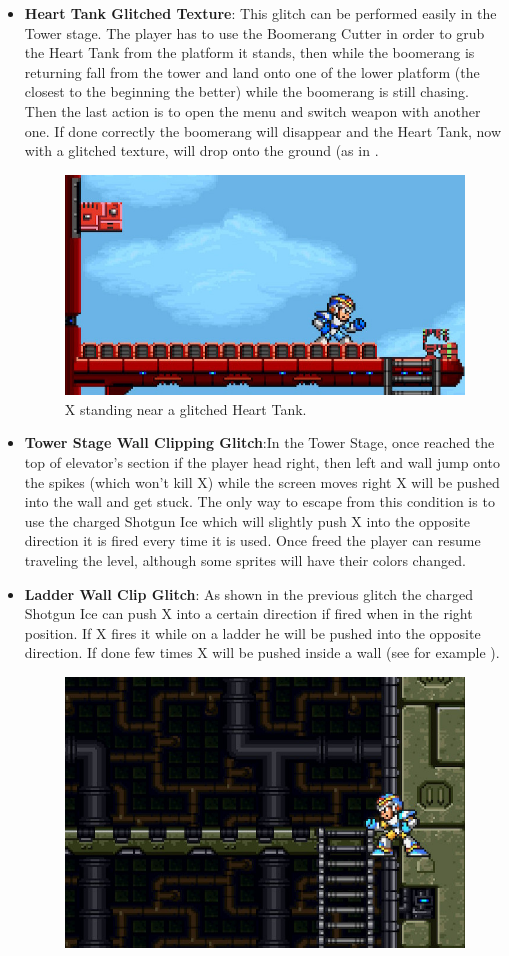\begin{itemize}
	\item \textbf{Heart Tank Glitched Texture}: This glitch can be performed easily in the Tower stage. The player has to use the Boomerang Cutter in order to grub the Heart Tank from the platform it stands, then while the boomerang is returning fall from the tower and land onto one of the lower platform (the closest to the beginning the better) while the boomerang is still chasing. Then the last action is to open the menu and switch weapon with another one. If done correctly the boomerang will disappear and the Heart Tank, now with a glitched texture, will drop onto the ground (as in .
	\begin{figure}[htp]
		\centering
		\includegraphics[width=0.5\linewidth]{figures/X1/Miscs/Tower_glitched_heart.jpg}
		\caption{X standing near a glitched Heart Tank.}
	\end{figure}
	\item \textbf{Tower Stage Wall Clipping Glitch}:In the Tower Stage, once reached the top of elevator's section if the player head right, then left and wall jump onto the spikes (which won't kill X) while the screen moves right X will be pushed into the wall and get stuck. The only way to escape from this condition is to use the charged Shotgun Ice which will slightly push X into the opposite direction it is fired every time it is used. Once freed the player can resume traveling the level, although some sprites will have their colors changed.
	\item \textbf{Ladder Wall Clip Glitch}: As shown in the previous glitch the charged Shotgun Ice can push X into a certain direction if fired when in the right position. If X fires it while on a ladder he will be pushed into the opposite direction. If done few times X will be pushed inside a wall (see for example ).
	\begin{figure}[htp]
		\centering
		\includegraphics[width=0.5\linewidth]{figures/X1/Miscs/Wall_clipping.jpg}

\end{figure}
\end{itemize}
